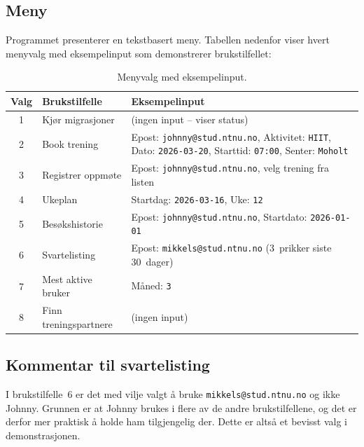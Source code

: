 \documentclass[11pt,a4paper]{article}
\begin{document}
\subsection{Meny}

Programmet presenterer en tekstbasert meny.
Tabellen nedenfor viser hvert menyvalg med eksempelinput som demonstrerer
brukstilfellet:

\begin{table}[H]
\centering
\small
\begin{tabular}{clp{7.8cm}}
\toprule
\textbf{Valg} & \textbf{Brukstilfelle} & \textbf{Eksempelinput} \\
\midrule
1 & Kjør migrasjoner       & (ingen input – viser status) \\
2 & Book trening           & Epost: \texttt{johnny@stud.ntnu.no},
                              Aktivitet: \texttt{HIIT},
                              Dato: \texttt{2026-03-20},
                              Starttid: \texttt{07:00},
                              Senter: \texttt{Moholt} \\
3 & Registrer oppmøte      & Epost: \texttt{johnny@stud.ntnu.no},
                              velg trening fra listen \\
4 & Ukeplan                & Startdag: \texttt{2026-03-16},
                              Uke: \texttt{12} \\
5 & Besøkshistorie         & Epost: \texttt{johnny@stud.ntnu.no},
                              Startdato: \texttt{2026-01-01} \\
6 & Svartelisting          & Epost: \texttt{mikkels@stud.ntnu.no}
                              (3~prikker siste 30~dager) \\
7 & Mest aktive bruker     & Måned: \texttt{3} \\
8 & Finn treningspartnere  & (ingen input) \\
\bottomrule
\end{tabular}
\caption{Menyvalg med eksempelinput.}
\end{table}

\subsection{Kommentar til svartelisting}

I brukstilfelle~6 er det med vilje valgt å bruke
\texttt{mikkels@stud.ntnu.no} og ikke Johnny. Grunnen er at Johnny brukes i
flere av de andre brukstilfellene, og det er derfor mer praktisk å holde ham
tilgjengelig der. Dette er altså et bevisst valg i demonstrasjonen.
\end{document}
